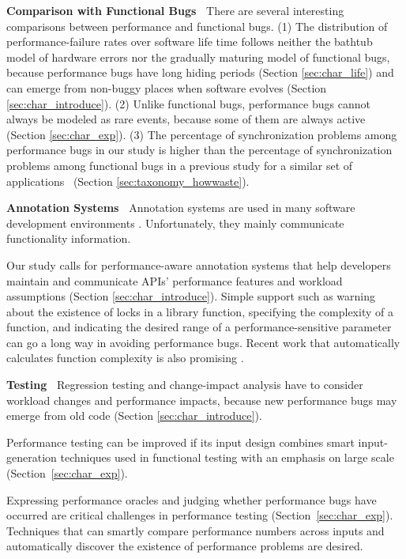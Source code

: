 {\bf Comparison with Functional Bugs\ }
There are several interesting comparisons between performance and functional
bugs. (1)
The distribution of performance-failure rates over software life time
follows neither the bathtub model of
hardware errors nor the gradually maturing model of functional bugs, because
performance bugs have long hiding periods (Section \ref{sec:char_life}) 
and can emerge from non-buggy 
places when software evolves (Section \ref{sec:char_introduce}).
(2) Unlike functional bugs, performance bugs cannot always be modeled as 
rare events, because some of them are always active 
(Section \ref{sec:char_exp}).
(3) The percentage of synchronization problems among
performance bugs in our study is higher than the percentage of synchronization
problems among functional bugs in a previous study for
a similar set of applications~\citep{LiASID06} (Section \ref{sec:taxonomy_howwaste}).

{\bf Annotation Systems\ }
Annotation systems are used in many software development environments
\citep{msdnannot,linuxannot}. Unfortunately, they mainly communicate
functionality information.%

Our study calls for performance-aware annotation systems
\citep{perfassert1,perfassert2}
that help developers maintain and communicate APIs' performance features
and workload assumptions (Section \ref{sec:char_introduce}).
Simple support such as warning about the existence of locks in
a library function, specifying the complexity of a function, and
indicating the desired range of a performance-sensitive parameter
can go a long way in avoiding performance bugs.
Recent work that automatically calculates function complexity is
also promising \citep{gulwani.popl2009}.

{\bf Testing\ }
Regression testing and change-impact analysis have to
consider workload changes and performance impacts, because new performance bugs
may emerge from old code
(Section \ref{sec:char_introduce}).

Performance testing can be improved if its input
design combines smart input-generation techniques used in functional testing
\citep{KLEE, dart} with an emphasis on large scale
(Section~\ref{sec:char_exp}).

Expressing performance oracles and judging whether performance bugs have 
occurred are critical challenges in performance testing 
(Section~\ref{sec:char_exp}). Techniques that can smartly compare performance
numbers across inputs and automatically discover the existence of 
performance problems are 
desired.

